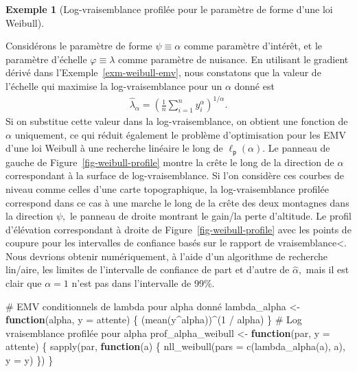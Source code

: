 \documentclass[
  11pt,
  letterpaper,
]{scrbook}
\newenvironment{Shaded}{\begin{snugshade}}{\end{snugshade}}
\newcommand{\AttributeTok}[1]{\textcolor[rgb]{0.40,0.45,0.13}{#1}}
\newcommand{\CommentTok}[1]{\textcolor[rgb]{0.37,0.37,0.37}{#1}}
\newcommand{\ControlFlowTok}[1]{\textcolor[rgb]{0.00,0.23,0.31}{\textbf{#1}}}
\newcommand{\DecValTok}[1]{\textcolor[rgb]{0.68,0.00,0.00}{#1}}
\newcommand{\FunctionTok}[1]{\textcolor[rgb]{0.28,0.35,0.67}{#1}}
\newcommand{\NormalTok}[1]{\textcolor[rgb]{0.00,0.23,0.31}{#1}}
\newcommand{\OtherTok}[1]{\textcolor[rgb]{0.00,0.23,0.31}{#1}}
\newcommand{\SpecialCharTok}[1]{\textcolor[rgb]{0.37,0.37,0.37}{#1}}
\theoremstyle{plain}
\theoremstyle{plain}
\theoremstyle{definition}
\newtheorem{example}{Exemple}[chapter]
\theoremstyle{definition}
\theoremstyle{remark}
\begin{document}
\begin{example}[Log-vraisemblance profilée pour le paramètre de forme
d'une loi
Weibull]\protect\hypertarget{exm-profile-alpha-weibull}{}\label{exm-profile-alpha-weibull}

Considérons le paramètre de forme \(\psi \equiv\alpha\) comme paramètre
d'intérêt, et le paramètre d'échelle \(\varphi\equiv\lambda\) comme
paramètre de nuisance. En utilisant le gradient dérivé dans
l'Exemple~\ref{exm-weibull-emv}, nous constatons que la valeur de
l'échelle qui maximise la log-vraisemblance pour un \(\alpha\) donné est
\begin{align*}
\widehat{\lambda}_\alpha = \left( \frac{1}{n}\sum_{i=1}^n y_i^\alpha\right)^{1/\alpha}.
\end{align*} Si on substitue cette valeur dans la log-vraisemblance, on
obtient une fonction de \(\alpha\) uniquement, ce qui réduit également
le problème d'optimisation pour les EMV d'une loi Weibull à une
recherche linéaire le long de \(\ell_{\mathsf{p}}(\alpha).\) Le panneau
de gauche de Figure~\ref{fig-weibull-profile} montre la crête le long de
la direction de \(\alpha\) correspondant à la surface de
log-vraisemblance. Si l'on considère ces courbes de niveau comme celles
d'une carte topographique, la log-vraisemblance profilée correspond dans
ce cas à une marche le long de la crête des deux montagnes dans la
direction \(\psi,\) le panneau de droite montrant le gain/la perte
d'altitude. Le profil d'élévation correspondant à droite de
Figure~\ref{fig-weibull-profile} avec les points de coupure pour les
intervalles de confiance basés sur le rapport de vraisemblance\textless.
Nous devrions obtenir numériquement, à l'aide d'un algorithme de
recherche lin/aire, les limites de l'intervalle de confiance de part et
d'autre de \(\widehat{\alpha},\) mais il est clair que \(\alpha=1\)
n'est pas dans l'intervalle de 99\%.

\begin{Shaded}
\begin{Highlighting}[]
\CommentTok{\# EMV conditionnels de lambda pour alpha donné}
\NormalTok{lambda\_alpha }\OtherTok{\textless{}{-}} \ControlFlowTok{function}\NormalTok{(alpha, }\AttributeTok{y =}\NormalTok{ attente) \{}
\NormalTok{  (}\FunctionTok{mean}\NormalTok{(y}\SpecialCharTok{\^{}}\NormalTok{alpha))}\SpecialCharTok{\^{}}\NormalTok{(}\DecValTok{1} \SpecialCharTok{/}\NormalTok{ alpha)}
\NormalTok{\}}
\CommentTok{\# Log vraisemblance profilée pour alpha}
\NormalTok{prof\_alpha\_weibull }\OtherTok{\textless{}{-}} \ControlFlowTok{function}\NormalTok{(par, }\AttributeTok{y =}\NormalTok{ attente) \{}
  \FunctionTok{sapply}\NormalTok{(par, }\ControlFlowTok{function}\NormalTok{(a) \{}
    \FunctionTok{nll\_weibull}\NormalTok{(}\AttributeTok{pars =} \FunctionTok{c}\NormalTok{(}\FunctionTok{lambda\_alpha}\NormalTok{(a), a), }\AttributeTok{y =}\NormalTok{ y)}
\NormalTok{  \})}
\NormalTok{\}}
\end{Highlighting}
\end{Shaded}

\end{example}
\end{document}
